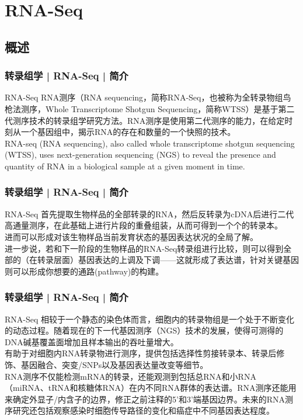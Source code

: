 \section{RNA-Seq}
\subsection{概述}
\begin{frame}
  \frametitle{转录组学 | RNA-Seq | 简介}
  \begin{block}{RNA-Seq}
 RNA测序（RNA sequencing，简称RNA-Seq，也被称为全转录物组鸟枪法测序，Whole Transcriptome Shotgun Sequencing，简称WTSS）是基于第二代测序技术的转录组学研究方法。RNA测序是使用第二代测序的能力，在给定时刻从一个基因组中，揭示RNA的存在和数量的一个快照的技术。\\
 \vspace{1em}
RNA-seq (RNA sequencing), also called whole transcriptome shotgun sequencing (WTSS), uses next-generation sequencing (NGS) to reveal the presence and quantity of RNA in a biological sample at a given moment in time.
  \end{block}
\end{frame}

\begin{frame}
  \frametitle{转录组学 | RNA-Seq | 简介}
  \begin{block}{RNA-Seq}
首先提取生物样品的全部转录的RNA，然后反转录为cDNA后进行二代高通量测序，在此基础上进行片段的重叠组装，从而可得到一个个的转录本。\\
\vspace{0.5em}
进而可以形成对该生物样品当前发育状态的基因表达状况的全局了解。\\
\vspace{0.5em}
进一步说，若和下一阶段的生物样品的RNA-Seq转录组进行比较，则可以得到全部的（在转录层面）基因表达的上调及下调——这就形成了表达谱，针对关键基因则可以形成你想要的通路(pathway)的构建。
  \end{block}
\end{frame}

\begin{frame}
  \frametitle{转录组学 | RNA-Seq | 简介}
  \begin{block}{RNA-Seq}
相较于一个静态的染色体而言，细胞内的转录物组是一个处于不断变化的动态过程。随着现在的下一代基因测序（NGS）技术的发展，使得可测得的DNA碱基覆盖面增加且样本输出的吞吐量增大。\\
\vspace{0.5em}
有助于对细胞内RNA转录物进行测序，提供包括选择性剪接转录本、转录后修饰、基因融合、突变/SNPs以及基因表达量改变等细节。\\
\vspace{0.5em}
RNA测序不仅能检测mRNA的转录，还能观测到包括总RNA和小RNA（miRNA、tRNA和核糖体RNA）在内不同RNA群体的表达谱。RNA测序还能用来确定外显子/内含子的边界，修正之前注释的5'和3'端基因边界。未来的RNA测序研究还包括观察感染时细胞传导路径的变化和癌症中不同基因表达程度。
  \end{block}
\end{frame}

